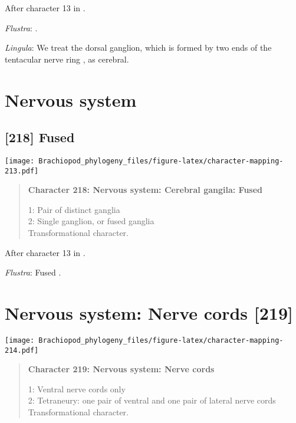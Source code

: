 \documentclass[openany]{book}
\theoremstyle{definition}
\theoremstyle{definition}
\theoremstyle{definition}
\theoremstyle{remark}
\begin{document}
After character 13 in \citet{Haszprunar1996}.

\hypertarget{Flustra-coding-217}{}
\emph{Flustra}: \citet{Temereva2016Thenervous}.

\hypertarget{Lingula-coding-217}{}
\emph{Lingula}: We treat the dorsal ganglion, which is formed by two
ends of the tentacular nerve ring \citep{Temereva2016Phoronida}, as
cerebral.

\section{Nervous system}\label{nervous-system-1}

\subsection*{{[}218{]} Fused}\label{fused}

\texttt{[image: Brachiopod\_phylogeny\_files/figure-latex/character-mapping-213.pdf]}

\begin{quote}
\textbf{Character 218: Nervous system: Cerebral gangila: Fused}

1: Pair of distinct ganglia\\
2: Single ganglion, or fused ganglia\\
Transformational character.
\end{quote}

After character 13 in \citet{Haszprunar1996}.

\hypertarget{Flustra-coding-218}{}
\emph{Flustra}: Fused \citep{Temereva2016Thenervous}.

\section{Nervous system: Nerve cords
{[}219{]}}\label{nervous-system-nerve-cords-219}

\texttt{[image: Brachiopod\_phylogeny\_files/figure-latex/character-mapping-214.pdf]}

\begin{quote}
\textbf{Character 219: Nervous system: Nerve cords}

1: Ventral nerve cords only\\
2: Tetraneury: one pair of ventral and one pair of lateral nerve cords\\
Transformational character.
\end{quote}
\end{document}
